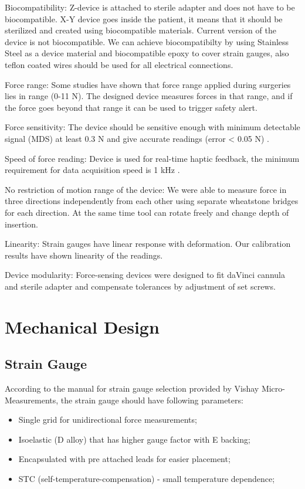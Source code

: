 	Biocompatibility: Z-device is attached to sterile adapter and does not have to be biocompatible. X-Y device goes inside the patient, it means that it should be sterilized and created using biocompatible materials. Current version of the device is not biocompatible. We can achieve biocompatibilty by using Stainless Steel as a device material and biocompatible epoxy to cover strain gauges, also teflon coated wires should be used for all electrical connections.
	
	Force range: Some studies \cite{mack_interactive_2012, prasad_modular_2003, } have shown that force range applied during surgeries lies in range (0-11 N). The designed device measures forces in that range, and if the force goes beyond that range it can be used to trigger safety alert.
	
	Force sensitivity: The device should be sensitive enough with minimum detectable signal (MDS) at least 0.3 N and give accurate readings (error < 0.05 N) \cite{mack_interactive_2012}.
	
	Speed of force reading: Device is used for real-time haptic feedback, the minimum requirement for data acquisition speed is 1 kHz \cite{seungmoon_choi_effect_2004}.
	
	No restriction of motion range of the device: We were able to measure force in three directions independently from each other using separate wheatstone bridges for each direction. At the same time tool can rotate freely and change depth of insertion.	
	
	Linearity: Strain gauges have linear response with deformation. Our calibration results have shown linearity of the readings.

	Device modularity: Force-sensing devices were designed to fit daVinci cannula and sterile adapter and compensate tolerances by adjustment of set screws.
	
\section{Mechanical Design}
\label{sec:mechDes}

	\subsection{Strain Gauge}
	\label{sec:SGReq}
	According to the manual for strain gauge selection provided by Vishay Micro-Measurements, the strain gauge should have following parameters:
\begin{itemize}
  \item Single grid for unidirectional force measurements;
  \item Isoelastic (D alloy) that has higher gauge factor with E backing;
  \item Encapsulated with pre attached leads for easier placement;
  \item STC (self-temperature-compensation) - small temperature dependence;
\end{itemize}	
	
